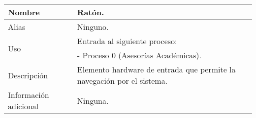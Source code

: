 \begin{center}
  \begin{tabular}{| l | p{9cm} |}
    \hline
    Nombre & \textbf{Ratón}.\\
    \hline
    Alias & Ninguno.\\
    \hline
    \multirow{2}{*}{Uso} & Entrada al siguiente proceso:\\
                         & - Proceso 0 (Asesorías Académicas).\\
    \hline
    Descripción & Elemento hardware de entrada que permite la navegación por
                  el sistema.\\
    \hline
    Información adicional & Ninguna.\\
    \hline
  \end{tabular}
\end{center}

